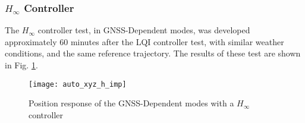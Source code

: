 \subsubsection{$H_\infty$ Controller}
The $H_\infty$ controller test, in GNSS-Dependent modes, was developed approximately $60$ minutes after the LQI controller test, with similar weather conditions, and the same reference trajectory. The results of these test are shown in Fig. \ref{fig:auto_xyz_h_imp}.
\begin{figure}[h]
	\begin{center}
	\texttt{[image: auto\_xyz\_h\_imp]}
	\caption{Position response of the GNSS-Dependent modes with a $H_\infty$ controller}
	\label{fig:auto_xyz_h_imp}
	\end{center}
	\end{figure}
%	


